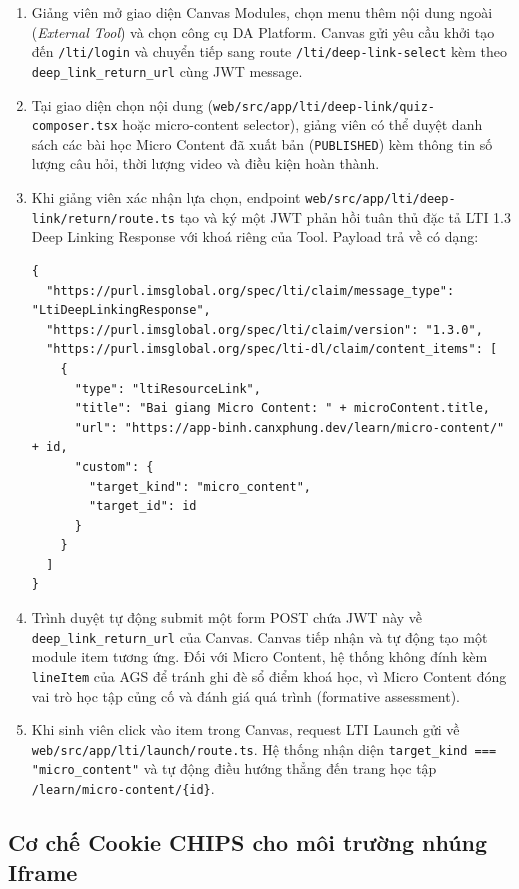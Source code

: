 \begin{enumerate}
    \item Giảng viên mở giao diện Canvas Modules, chọn menu thêm nội dung ngoài (\textit{External Tool}) và chọn công cụ DA Platform. Canvas gửi yêu cầu khởi tạo đến \texttt{/lti/login} và chuyển tiếp sang route \texttt{/lti/deep-link-select} kèm theo \texttt{deep\_link\_return\_url} cùng JWT message.
    \item Tại giao diện chọn nội dung (\texttt{web/src/app/lti/deep-link/quiz-composer.tsx} hoặc micro-content selector), giảng viên có thể duyệt danh sách các bài học Micro Content đã xuất bản (\texttt{PUBLISHED}) kèm thông tin số lượng câu hỏi, thời lượng video và điều kiện hoàn thành.
    \item Khi giảng viên xác nhận lựa chọn, endpoint \texttt{web/src/app/lti/deep-link/return/route.ts} tạo và ký một JWT phản hồi tuân thủ đặc tả LTI 1.3 Deep Linking Response với khoá riêng của Tool. Payload trả về có dạng:
\begin{lstlisting}[caption={Payload JWT trả về Canvas qua Deep Linking 2.0.}]
{
  "https://purl.imsglobal.org/spec/lti/claim/message_type": "LtiDeepLinkingResponse",
  "https://purl.imsglobal.org/spec/lti/claim/version": "1.3.0",
  "https://purl.imsglobal.org/spec/lti-dl/claim/content_items": [
    {
      "type": "ltiResourceLink",
      "title": "Bai giang Micro Content: " + microContent.title,
      "url": "https://app-binh.canxphung.dev/learn/micro-content/" + id,
      "custom": {
        "target_kind": "micro_content",
        "target_id": id
      }
    }
  ]
}
\end{lstlisting}
    \item Trình duyệt tự động submit một form POST chứa JWT này về \texttt{deep\_link\_return\_url} của Canvas. Canvas tiếp nhận và tự động tạo một module item tương ứng. Đối với Micro Content, hệ thống không đính kèm \texttt{lineItem} của AGS để tránh ghi đè sổ điểm khoá học, vì Micro Content đóng vai trò học tập củng cố và đánh giá quá trình (formative assessment).
    \item Khi sinh viên click vào item trong Canvas, request LTI Launch gửi về \texttt{web/src/app/lti/launch/route.ts}. Hệ thống nhận diện \texttt{target\_kind === "micro\_content"} và tự động điều hướng thẳng đến trang học tập \texttt{/learn/micro-content/\{id\}}.
\end{enumerate}

\subsection{Cơ chế Cookie CHIPS cho môi trường nhúng Iframe}
\label{subsec:chips-cookie-impl}


